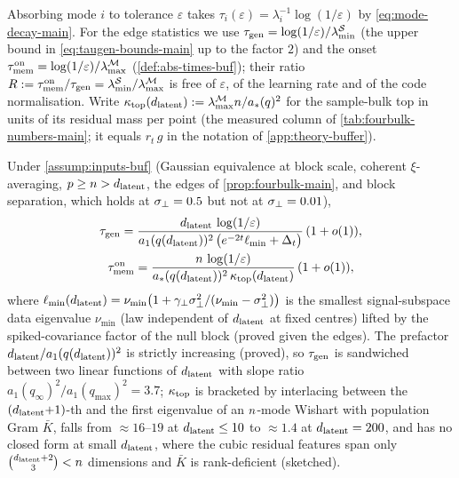 Absorbing mode $i$ to tolerance $\varepsilon$ takes $\tau_i(\varepsilon)=\lambda_i^{-1}\log(1/\varepsilon)$ by \eqref{eq:mode-decay-main}. For the edge statistics we use $\tau_{\mathrm{gen}}=\log(1/\varepsilon)/\lambda^{\mathcal S}_{\min}$ (the upper bound in \eqref{eq:taugen-bounds-main} up to the factor $2$) and the onset $\tau_{\mathrm{mem}}^{\rm on}=\log(1/\varepsilon)/\lambda^{\mathcal M}_{\max}$ (\cref{def:abs-times-buf}); their ratio $R:=\tau_{\mathrm{mem}}^{\rm on}/\tau_{\mathrm{gen}}=\lambda^{\mathcal S}_{\min}/\lambda^{\mathcal M}_{\max}$ is free of $\varepsilon$, of the learning rate and of the code normalisation. Write $\kappa_{\rm top}(d_{\mathrm{latent}}):=\lambda^{\mathcal M}_{\max}n/a_*(q)^2$ for the sample-bulk top in units of its residual mass per point (the measured column of \cref{tab:fourbulk-numbers-main}; it equals $r_t\,g$ in the notation of \cref{app:theory-buffer}).

\begin{proposition}\label{prop:buffer-main}
Under \cref{assump:inputs-buf} (Gaussian equivalence at block scale, coherent $\xi$-averaging, $p\ge n>d_{\mathrm{latent}}$, the edges of \cref{prop:fourbulk-main}, and block separation, which holds at $\sigma_{\perp}=0.5$ but not at $\sigma_{\perp}=0.01$),
\begin{gather}
\tau_{\mathrm{gen}}=\frac{d_{\mathrm{latent}}\,\log(1/\varepsilon)}{a_1(q(d_{\mathrm{latent}}))^2\,\bigl(e^{-2t}\ell_{\min}+\Delta_t\bigr)}\,(1+o(1)),\label{eq:tau-scalings-buf}\\
\tau_{\mathrm{mem}}^{\rm on}=\frac{n\,\log(1/\varepsilon)}{a_*(q(d_{\mathrm{latent}}))^2\,\kappa_{\rm top}(d_{\mathrm{latent}})}\,(1+o(1)),\label{eq:tauon-main}
\end{gather}
where $\ell_{\min}(d_{\mathrm{latent}})=\nu_{\min}\bigl(1+\gamma_\perp\sigma_{\perp}^2/(\nu_{\min}-\sigma_{\perp}^2)\bigr)$ is the smallest signal-subspace data eigenvalue $\nu_{\min}$ (law independent of $d_{\mathrm{latent}}$ at fixed centres) lifted by the spiked-covariance factor of the null block \citep{baik2005phase} (proved given the edges). The prefactor $d_{\mathrm{latent}}/a_1(q(d_{\mathrm{latent}}))^2$ is strictly increasing (proved), so $\tau_{\mathrm{gen}}$ is sandwiched between two linear functions of $d_{\mathrm{latent}}$ with slope ratio $a_1(q_\infty)^2/a_1(q_{\max})^2=3.7$; $\kappa_{\rm top}$ is bracketed by interlacing between the $(d_{\mathrm{latent}}{+}1)$-th and the first eigenvalue of an $n$-mode Wishart with population Gram $\bar K$, falls from $\approx16$--$19$ at $d_{\mathrm{latent}}\le10$ to $\approx1.4$ at $d_{\mathrm{latent}}=200$, and has no closed form at small $d_{\mathrm{latent}}$, where the cubic residual features span only $\binom{d_{\mathrm{latent}}+2}{3}<n$ dimensions and $\bar K$ is rank-deficient (sketched).
\end{proposition}

